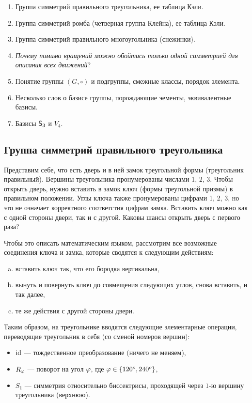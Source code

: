 \begin{enumerate}
\item Группа симметрий правильного треугольника, ее таблица Кэли.
\item Группа симметрий ромба (четверная группа Клейна), ее таблица Кэли.
\item Группа симметрий правильного многоугольника (снежинки).
\item \textit{Почему помимо вращений можно обойтись только одной симметрией для описания всех движений}?
\item Понятие группы $(G,\circ)$ и подгруппы, смежные классы, порядок элемента.
\item Несколько слов о базисе группы, порождающие эементы, эквивалентные базисы.
\item Базисы ${\mathsf{S}}_3$ и $V_4$.
\end{enumerate}

\subsection{Группа симметрий правильного треугольника}

Представим себе, что есть дверь и в ней замок треугольной формы (треугольник правильный). Вершины треугольника пронумерованы числами 1, 2, 3. Чтобы открыть дверь, нужно вставить в замок ключ (формы треугольной призмы) в правильном положении.
Углы ключа также пронумерованы цифрами 1, 2, 3, но это не означает корректного соответстия цифрам замка.
Вставить ключ можно как с одной стороны двери, так и с другой. Каковы шансы открыть дверь с первого раза?

Чтобы это описать математическим языком, рассмотрим все возможные соединения ключа и замка, которые сводятся к следующим действиям:
\begin{enumerate}[a)]
\item вставить ключ так, что его бородка вертикальна,
\item вынуть и повернуть ключ до совмещения следующих углов, снова вставить, и так далее,
\item те же действия с другой стороны двери.
\end{enumerate}

Таким образом, на треугольнике вводятся следующие элементарные операции, переводящие треугольник в себя (со сменой номеров вершин):
\begin{itemize}
\item $\mathrm{id}$ --- тождественное преобразование (ничего не меняем),
\item $R_\varphi$ --- поворот на угол $\varphi$, где $\varphi\in\{120^o,240^o\}$,
\item $S_1$ --- симметрия относительно биссектрисы, проходящей через $1$-ю вершину треугольника (верхнюю).
\end{itemize}

